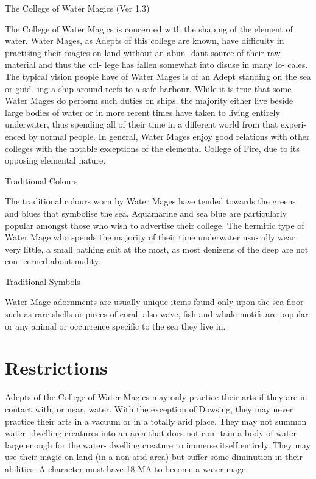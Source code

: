 \begin{Chapter}{The College of Water Magics (Ver 1.3)}

The College of Water Magics is concerned with the 
shaping  of  the  element  of  water.  Water  Mages,  as 
Adepts of this college are known, have difficulty in 
practising  their  magics  on  land  without  an  abun-
dant source of their raw material and thus the col-
lege  has  fallen  somewhat  into  disuse  in  many  lo-
cales.  The  typical  vision  people  have  of  Water 
Mages is of an Adept standing on the sea or guid-
ing a ship around reefs to a safe harbour. While it 
is  true  that  some  Water  Mages  do  perform  such 
duties on ships, the majority either live beside large 
bodies of water or in more recent times have taken 
to  living  entirely  underwater,  thus  spending  all  of 
their  time  in  a  different  world  from  that  experi-
enced  by  normal  people.  In  general,  Water  Mages 
enjoy  good  relations  with  other  colleges  with  the 
notable  exceptions  of  the  elemental  College  of 
Fire, due to its opposing elemental nature. 

Traditional Colours 

The traditional colours worn by Water Mages have 
tended towards the greens and blues that symbolise 
the  sea.  Aquamarine  and  sea  blue  are  particularly 
popular amongst those who wish to advertise their 
college.  The  hermitic  type  of  Water  Mage  who 
spends  the  majority  of  their  time  underwater  usu-
ally  wear  very  little,  a  small  bathing  suit  at  the 
most,  as  most  denizens  of  the  deep  are  not  con-
cerned about nudity. 

Traditional Symbols 

Water  Mage  adornments  are  usually  unique  items 
found only upon the sea floor such as rare shells or 
pieces  of  coral,  also  wave,  fish  and  whale  motifs 
are popular or any animal or occurrence specific to 
the sea they live in. 

\section{Restrictions}

Adepts  of  the  College  of  Water  Magics  may  only 
practice  their  arts  if  they  are  in  contact  with,  or 
near,  water.  With  the  exception  of  Dowsing,  they 
may  never  practice  their  arts  in  a  vacuum  or  in  a 
totally  arid  place.  They  may  not  summon  water-
dwelling  creatures  into  an  area  that  does  not  con-
tain  a  body  of  water  large  enough  for  the  water-
dwelling  creature  to  immerse  itself  entirely.  They 
may  use  their  magic  on  land  (in  a  non-arid  area) 
but  suffer  some  diminution  in  their  abilities.  A 
character  must  have  18  MA  to  become  a  water 
mage. 


\end{Chapter}
